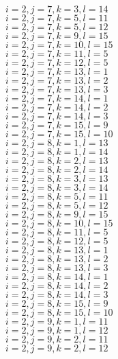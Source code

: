 \documentclass[14pt]{article}
\begin{document}
    $i=2,j=7,k=3,l=14 $ \\ 
    $i=2,j=7,k=5,l=11 $ \\ 
    $i=2,j=7,k=5,l=12 $ \\ 
    $i=2,j=7,k=9,l=15 $ \\ 
    $i=2,j=7,k=10,l=15 $ \\ 
    $i=2,j=7,k=11,l=5 $ \\ 
    $i=2,j=7,k=12,l=5 $ \\ 
    $i=2,j=7,k=13,l=1 $ \\ 
    $i=2,j=7,k=13,l=2 $ \\ 
    $i=2,j=7,k=13,l=3 $ \\ 
    $i=2,j=7,k=14,l=1 $ \\ 
    $i=2,j=7,k=14,l=2 $ \\ 
    $i=2,j=7,k=14,l=3 $ \\ 
    $i=2,j=7,k=15,l=9 $ \\ 
    $i=2,j=7,k=15,l=10 $ \\ 
    $i=2,j=8,k=1,l=13 $ \\ 
    $i=2,j=8,k=1,l=14 $ \\ 
    $i=2,j=8,k=2,l=13 $ \\ 
    $i=2,j=8,k=2,l=14 $ \\ 
    $i=2,j=8,k=3,l=13 $ \\ 
    $i=2,j=8,k=3,l=14 $ \\ 
    $i=2,j=8,k=5,l=11 $ \\ 
    $i=2,j=8,k=5,l=12 $ \\ 
    $i=2,j=8,k=9,l=15 $ \\ 
    $i=2,j=8,k=10,l=15 $ \\ 
    $i=2,j=8,k=11,l=5 $ \\ 
    $i=2,j=8,k=12,l=5 $ \\ 
    $i=2,j=8,k=13,l=1 $ \\ 
    $i=2,j=8,k=13,l=2 $ \\ 
    $i=2,j=8,k=13,l=3 $ \\ 
    $i=2,j=8,k=14,l=1 $ \\ 
    $i=2,j=8,k=14,l=2 $ \\ 
    $i=2,j=8,k=14,l=3 $ \\ 
    $i=2,j=8,k=15,l=9 $ \\ 
    $i=2,j=8,k=15,l=10 $ \\ 
    $i=2,j=9,k=1,l=11 $ \\ 
    $i=2,j=9,k=1,l=12 $ \\ 
    $i=2,j=9,k=2,l=11 $ \\ 
    $i=2,j=9,k=2,l=12 $ \\ 
\end{document}
